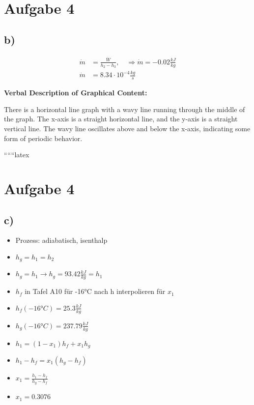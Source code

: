 \section*{Aufgabe 4}

\subsection*{b)}
\begin{align*}
\dot{m} &= \frac{\dot{W}}{h_2 - h_3}, \quad \Rightarrow \dot{m} = -0.02 \frac{kJ}{kg} \\
\dot{m} &= 8.34 \cdot 10^{-4} \frac{kg}{s}
\end{align*}

\textbf{Verbal Description of Graphical Content:}

There is a horizontal line graph with a wavy line running through the middle of the graph. The x-axis is a straight horizontal line, and the y-axis is a straight vertical line. The wavy line oscillates above and below the x-axis, indicating some form of periodic behavior.

``````latex

\section*{Aufgabe 4}

\subsection*{c)}
\begin{itemize}
    \item Prozess: adiabatisch, isenthalp
    \item \( h_{g} = h_{1} = h_{2} \)
    \item \( h_{g} = h_{1} \rightarrow h_{g} = 93.42 \frac{kJ}{kg} = h_{1} \)
    \item \( h_{f} \) in Tafel A10 für -16°C nach h interpolieren für \( x_{1} \)
    \item \( h_{f} (-16°C) = 25.3 \frac{kJ}{kg} \)
    \item \( h_{g} (-16°C) = 237.79 \frac{kJ}{kg} \)
    \item \( h_{1} = (1 - x_{1}) h_{f} + x_{1} h_{g} \)
    \item \( h_{1} - h_{f} = x_{1} (h_{g} - h_{f}) \)
    \item \( x_{1} = \frac{h_{1} - h_{f}}{h_{g} - h_{f}} \)
    \item \( x_{1} = 0.3076 \)
\end{itemize}

